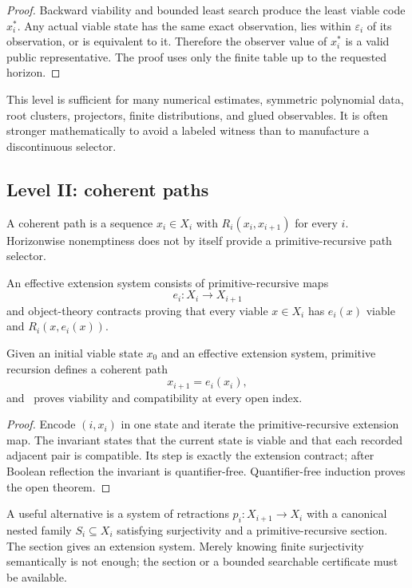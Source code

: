 \begin{proof}
Backward viability and bounded least search produce the least viable code \(x_i^*\).  Any actual viable state has the same exact observation, lies within \(\varepsilon_i\) of its observation, or is equivalent to it.  Therefore the observer value of \(x_i^*\) is a valid public representative.  The proof uses only the finite table up to the requested horizon.
\end{proof}

This level is sufficient for many numerical estimates, symmetric polynomial data, root clusters, projectors, finite distributions, and glued observables.  It is often stronger mathematically to avoid a labeled witness than to manufacture a discontinuous selector.

\subsection{Level II: coherent paths}

A coherent path is a sequence \(x_i\in X_i\) with \(R_i(x_i,x_{i+1})\) for every \(i\).  Horizonwise nonemptiness does not by itself provide a primitive-recursive path selector.

\begin{definition}
An effective extension system consists of primitive-recursive maps
\[
 e_i:X_i\to X_{i+1}
\]
and object-theory contracts proving that every viable \(x\in X_i\) has \(e_i(x)\) viable and \(R_i(x,e_i(x))\).
\end{definition}

\begin{theorem}\label{thm:path-extension}
Given an initial viable state \(x_0\) and an effective extension system, primitive recursion defines a coherent path
\[
 x_{i+1}=e_i(x_i),
\]
and \iPRA\ proves viability and compatibility at every open index.
\end{theorem}

\begin{proof}
Encode \((i,x_i)\) in one state and iterate the primitive-recursive extension map.  The invariant states that the current state is viable and that each recorded adjacent pair is compatible.  Its step is exactly the extension contract; after Boolean reflection the invariant is quantifier-free.  Quantifier-free induction proves the open theorem.
\end{proof}

A useful alternative is a system of retractions \(p_i:X_{i+1}\to X_i\) with a canonical nested family \(S_i\subseteq X_i\) satisfying surjectivity and a primitive-recursive section.  The section gives an extension system.  Merely knowing finite surjectivity semantically is not enough; the section or a bounded searchable certificate must be available.

